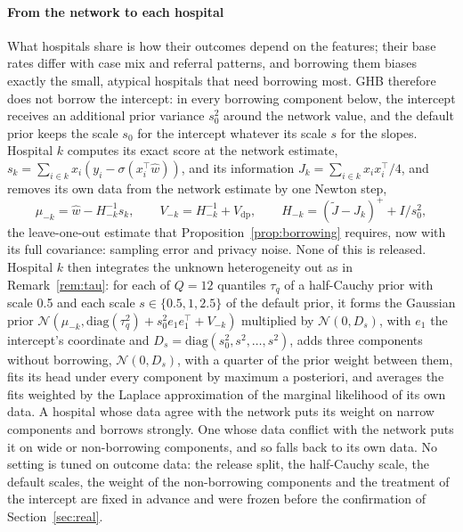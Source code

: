 \documentclass[acmsmall,screen,review]{acmart}
\theoremstyle{acmdefinition}
\begin{document}
\paragraph{From the network to each hospital} What hospitals share is how their outcomes depend on the features; their base rates differ with case mix and referral patterns, and borrowing them biases exactly the small, atypical hospitals that need borrowing most. GHB therefore does not borrow the intercept: in every borrowing component below, the intercept receives an additional prior variance $s_0^2$ around the network value, and the default prior keeps the scale $s_0$ for the intercept whatever its scale $s$ for the slopes. Hospital $k$ computes its exact score at the network estimate, $s_k=\sum_{i\in k}x_i(y_i-\sigma(x_i^{\top}\hat{w}))$, and its information $J_k=\sum_{i\in k}x_ix_i^{\top}/4$, and removes its own data from the network estimate by one Newton step,
\[
\mu_{-k}=\hat{w}-H_{-k}^{-1}s_k,\qquad V_{-k}=H_{-k}^{-1}+V_{\mathrm{dp}},\qquad H_{-k}=(\tilde{J}-J_k)^{+}+I/s_0^2,
\]
the leave-one-out estimate that Proposition~\ref{prop:borrowing} requires, now with its full covariance: sampling error and privacy noise. None of this is released. Hospital $k$ then integrates the unknown heterogeneity out as in Remark~\ref{rem:tau}: for each of $Q=12$ quantiles $\tau_q$ of a half-Cauchy prior with scale 0.5 and each scale $s\in\{0.5,1,2.5\}$ of the default prior, it forms the Gaussian prior $\mathcal{N}(\mu_{-k},\mathrm{diag}(\tau_q^2)+s_0^2e_1e_1^{\top}+V_{-k})$ multiplied by $\mathcal{N}(0,D_s)$, with $e_1$ the intercept's coordinate and $D_s=\mathrm{diag}(s_0^2,s^2,\dots,s^2)$, adds three components without borrowing, $\mathcal{N}(0,D_s)$, with a quarter of the prior weight between them, fits its head under every component by maximum a posteriori, and averages the fits weighted by the Laplace approximation of the marginal likelihood of its own data. A hospital whose data agree with the network puts its weight on narrow components and borrows strongly. One whose data conflict with the network puts it on wide or non-borrowing components, and so falls back to its own data. No setting is tuned on outcome data: the release split, the half-Cauchy scale, the default scales, the weight of the non-borrowing components and the treatment of the intercept are fixed in advance and were frozen before the confirmation of Section~\ref{sec:real}.
\end{document}
